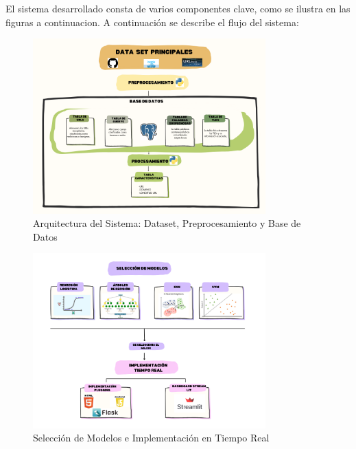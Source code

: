 El sistema desarrollado consta de varios componentes clave, como se ilustra en las figuras a continuacion. A continuación se describe el flujo del sistema:
\begin{figure}[H]
    \centering
    \includegraphics[width=0.8\textwidth]{imagenn2.png}
    \caption{Arquitectura del Sistema: Dataset, Preprocesamiento y Base de Datos}
\end{figure}

\begin{figure}[H]
    \centering
    \includegraphics[width=0.8\textwidth]{imagenn3.png}
    \caption{Selección de Modelos e Implementación en Tiempo Real}
\end{figure}


